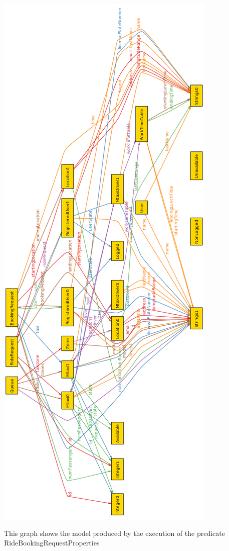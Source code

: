 \documentclass[11pt,titlepage]{article} %
\begin{document}
		\begin{center}
		\includegraphics[scale=0.35]{pred1.png}
		\end{center}
		\newpage
		This graph shows the model produced by the execution of the predicate RideBookingRequestProperties
\end{document}

